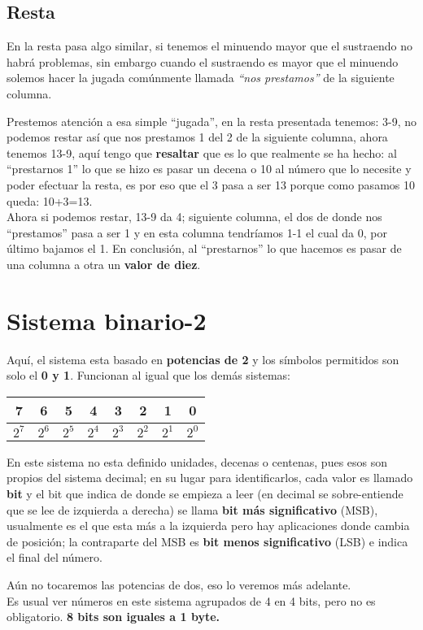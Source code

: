\documentclass[
	12pt, %
	fleqn, %
	a4paper, %
]{LegrandOrangeBook}
\begin{document}
\subsection{Resta}
En la resta pasa algo similar, si tenemos el minuendo mayor que el sustraendo no habrá problemas, sin embargo cuando el sustraendo es mayor que el minuendo solemos hacer la jugada comúnmente llamada \textit{``nos prestamos''} de la siguiente columna.
\begin{center}
\end{center}
Prestemos atención a esa simple ``jugada'',  en la resta presentada tenemos: 3-9, no podemos restar así que nos prestamos 1 del 2 de la siguiente columna, ahora tenemos 13-9, aquí tengo que \textbf{resaltar} que es lo que realmente se ha hecho: al ``prestarnos 1'' lo que se hizo es pasar un decena o 10 al número que lo necesite y poder efectuar la resta, es por eso que el 3 pasa a ser 13 porque como pasamos 10 queda: 10+3=13.\\
Ahora si podemos restar, 13-9 da 4; siguiente columna, el dos de donde nos ``prestamos'' pasa a ser 1 y en esta columna tendríamos 1-1 el cual da 0, por último bajamos el 1. En conclusión, al ``prestarnos'' lo que hacemos es pasar de una columna a otra un \textbf{valor de diez}.
\section{Sistema binario-2}
Aquí, el sistema esta basado en \textbf{potencias de 2} y los símbolos permitidos son solo el \textbf{0 y 1}. Funcionan al igual que los demás sistemas:
\begin{center}
\begin{tabular}{|c|c|c|c|c|c|c|c|}
\hline
7     & 6     & 5     & 4     & 3     & 2     & 1     & 0     \\ \hline
$2^7$ & $2^6$ & $2^5$ & $2^4$ & $2^3$ & $2^2$ & $2^1$ & $2^0$ \\ \hline
\end{tabular}
\end{center}
\begin{remark}
En este sistema no esta definido unidades, decenas o centenas, pues esos son propios del sistema decimal; en su lugar para identificarlos, cada valor es llamado \textbf{bit} y el bit que indica de donde se empieza a leer (en decimal se sobre-entiende que se lee de izquierda a derecha) se llama \textbf{bit más significativo} (MSB), usualmente es el que esta más a la izquierda pero hay aplicaciones donde cambia de posición; la contraparte del MSB es \textbf{bit menos significativo} (LSB) e indica el final del número.
\end{remark}
Aún no tocaremos las potencias de dos, eso lo veremos más adelante.\\
Es usual ver números en este sistema agrupados de 4 en 4 bits, pero no es obligatorio. \textbf{8 bits son iguales a 1 byte.}
\end{document}
